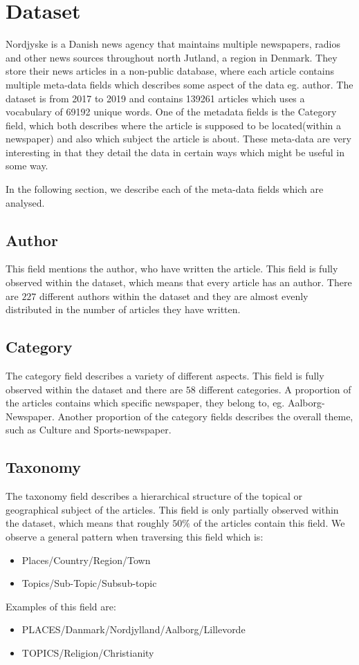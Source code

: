 \section{Dataset}
Nordjyske is a Danish news agency that maintains multiple newspapers, radios and other news sources throughout north Jutland, a region in Denmark.
They store their news articles in a non-public database, where each article contains multiple meta-data fields which describes some aspect of the data eg. author.
The dataset is from 2017 to 2019 and contains 139261 articles which uses a vocabulary of 69192 unique words.
One of the metadata fields is the Category field, which both describes where the article is supposed to be located(within a newspaper) and also which subject the article is about.
These meta-data are very interesting in that they detail the data in certain ways which might be useful in some way.

In the following section, we describe each of the meta-data fields which are analysed.

\subsection{Author}
This field mentions the author, who have written the article.
This field is fully observed within the dataset, which means that every article has an author.
There are $227$ different authors within the dataset and they are almost evenly distributed in the number of articles they have written.

\subsection{Category}
The category field describes a variety of different aspects. 
This field is fully observed within the dataset and there are $58$ different categories.
A proportion of the articles contains which specific newspaper, they belong to, eg. Aalborg-Newspaper.
Another proportion of the category fields describes the overall theme, such as Culture and Sports-newspaper.


\subsection{Taxonomy}
The taxonomy field describes a hierarchical structure of the topical or geographical subject of the articles.
This field is only partially observed within the dataset, which means that roughly $50\%$ of the articles contain this field.
We observe a general pattern when traversing this field which is:
\begin{itemize}
	\item Places/Country/Region/Town
	\item Topics/Sub-Topic/Subsub-topic
\end{itemize}
Examples of this field are:
\begin{itemize}
	\item PLACES/Danmark/Nordjylland/Aalborg/Lillevorde
	\item TOPICS/Religion/Christianity
\end{itemize}